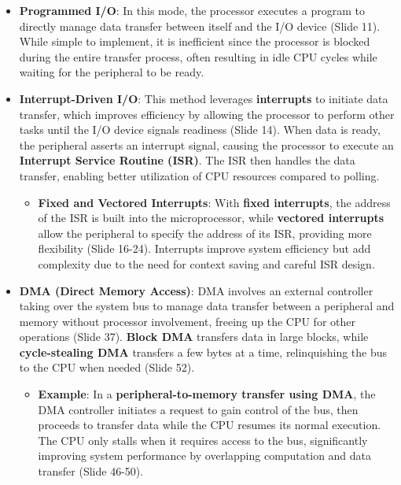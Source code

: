 \documentclass[
  14pt,
  a4paper,
  numbers=noendperiod,
  headinclude=true,
  footinclude=true,
  DIV=calc]{scrreprt}
\providecommand{\tightlist}{%
  \setlength{\itemsep}{0pt}\setlength{\parskip}{0pt}}\usepackage{longtable,booktabs,array}
\begin{document}
\begin{itemize}
\item
  \textbf{Programmed I/O}: In this mode, the processor executes a
  program to directly manage data transfer between itself and the I/O
  device (Slide 11). While simple to implement, it is inefficient since
  the processor is blocked during the entire transfer process, often
  resulting in idle CPU cycles while waiting for the peripheral to be
  ready.
\item
  \textbf{Interrupt-Driven I/O}: This method leverages
  \textbf{interrupts} to initiate data transfer, which improves
  efficiency by allowing the processor to perform other tasks until the
  I/O device signals readiness (Slide 14). When data is ready, the
  peripheral asserts an interrupt signal, causing the processor to
  execute an \textbf{Interrupt Service Routine (ISR)}. The ISR then
  handles the data transfer, enabling better utilization of CPU
  resources compared to polling.

  \begin{itemize}
  \tightlist
  \item
    \textbf{Fixed and Vectored Interrupts}: With \textbf{fixed
    interrupts}, the address of the ISR is built into the
    microprocessor, while \textbf{vectored interrupts} allow the
    peripheral to specify the address of its ISR, providing more
    flexibility (Slide 16-24). Interrupts improve system efficiency but
    add complexity due to the need for context saving and careful ISR
    design.
  \end{itemize}
\item
  \textbf{DMA (Direct Memory Access)}: DMA involves an external
  controller taking over the system bus to manage data transfer between
  a peripheral and memory without processor involvement, freeing up the
  CPU for other operations (Slide 37). \textbf{Block DMA} transfers data
  in large blocks, while \textbf{cycle-stealing DMA} transfers a few
  bytes at a time, relinquishing the bus to the CPU when needed (Slide
  52).

  \begin{itemize}
  \tightlist
  \item
    \textbf{Example}: In a \textbf{peripheral-to-memory transfer using
    DMA}, the DMA controller initiates a request to gain control of the
    bus, then proceeds to transfer data while the CPU resumes its normal
    execution. The CPU only stalls when it requires access to the bus,
    significantly improving system performance by overlapping
    computation and data transfer (Slide 46-50).
  \end{itemize}
\end{itemize}
\end{document}
